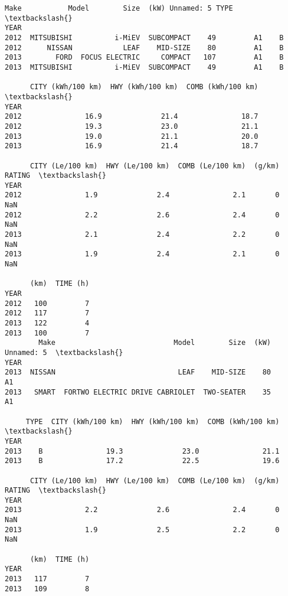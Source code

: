 \documentclass[11pt]{article}
\begin{document}
    \begin{Verbatim}[commandchars=\\\{\}]
            Make           Model        Size  (kW) Unnamed: 5 TYPE  \textbackslash{}
YEAR                                                                 
2012  MITSUBISHI          i-MiEV  SUBCOMPACT    49         A1    B   
2012      NISSAN            LEAF    MID-SIZE    80         A1    B   
2013        FORD  FOCUS ELECTRIC     COMPACT   107         A1    B   
2013  MITSUBISHI          i-MiEV  SUBCOMPACT    49         A1    B   

      CITY (kWh/100 km)  HWY (kWh/100 km)  COMB (kWh/100 km)  \textbackslash{}
YEAR                                                           
2012               16.9              21.4               18.7   
2012               19.3              23.0               21.1   
2013               19.0              21.1               20.0   
2013               16.9              21.4               18.7   

      CITY (Le/100 km)  HWY (Le/100 km)  COMB (Le/100 km)  (g/km)  RATING  \textbackslash{}
YEAR                                                                        
2012               1.9              2.4               2.1       0     NaN   
2012               2.2              2.6               2.4       0     NaN   
2013               2.1              2.4               2.2       0     NaN   
2013               1.9              2.4               2.1       0     NaN   

      (km)  TIME (h)  
YEAR                  
2012   100         7  
2012   117         7  
2013   122         4  
2013   100         7  
        Make                            Model        Size  (kW) Unnamed: 5  \textbackslash{}
YEAR                                                                         
2013  NISSAN                             LEAF    MID-SIZE    80         A1   
2013   SMART  FORTWO ELECTRIC DRIVE CABRIOLET  TWO-SEATER    35         A1   

     TYPE  CITY (kWh/100 km)  HWY (kWh/100 km)  COMB (kWh/100 km)  \textbackslash{}
YEAR                                                                
2013    B               19.3              23.0               21.1   
2013    B               17.2              22.5               19.6   

      CITY (Le/100 km)  HWY (Le/100 km)  COMB (Le/100 km)  (g/km)  RATING  \textbackslash{}
YEAR                                                                        
2013               2.2              2.6               2.4       0     NaN   
2013               1.9              2.5               2.2       0     NaN   

      (km)  TIME (h)  
YEAR                  
2013   117         7  
2013   109         8  

    \end{Verbatim}
\end{document}
